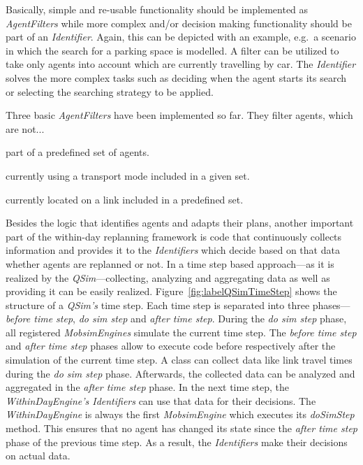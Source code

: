 Basically, simple and re-usable functionality should be implemented as \textit{AgentFilters} while more complex and/or decision making functionality should be part of an \textit{Identifier}. Again, this can be depicted with an example, e.g.\ a scenario in which the search for a parking space is modelled. A filter can be utilized to take only agents into account which are currently travelling by car. The \textit{Identifier} solves the more complex tasks such as deciding when the agent starts its search or selecting the searching strategy to be applied.

Three basic \emph{AgentFilters} have been implemented so far. They filter agents, which are not...
\begin{compactitem}
    \item part of a predefined set of agents.
    \item currently using a transport mode included in a given set.
    \item currently located on a link included in a predefined set.
\end{compactitem}

Besides the logic that identifies agents and adapts their plans, another important part of the within-day replanning framework is code that continuously collects information and provides it to the \emph{Identifiers} which decide based on that data whether agents are replanned or not. In a time step based approach---as it is realized by the \emph{QSim}---collecting, analyzing and aggregating data as well as providing it can be easily realized. Figure~\ref{fig:labelQSimTimeStep} shows the structure of a \emph{QSim's} time step. Each time step is separated into three phases---\emph{before time step}, \emph{do sim step} and \emph{after time step}. During the \emph{do sim step} phase, all registered \emph{MobsimEngines} simulate the current time step. The \emph{before time step} and \emph{after time step} phases allow to execute code before respectively after the simulation of the current time step. A class can collect data like link travel times during the \emph{do sim step} phase. Afterwards, the collected data can be analyzed and aggregated in the \emph{after time step} phase. In the next time step, the \emph{WithinDayEngine's Identifiers} can use that data for their decisions. The \emph{WithinDayEngine} is always the first \emph{MobsimEngine} which executes its \emph{doSimStep} method. This ensures that no agent has changed its state since the \emph{after time step} phase of the previous time step. As a result, the \emph{Identifiers} make their decisions on actual data.

